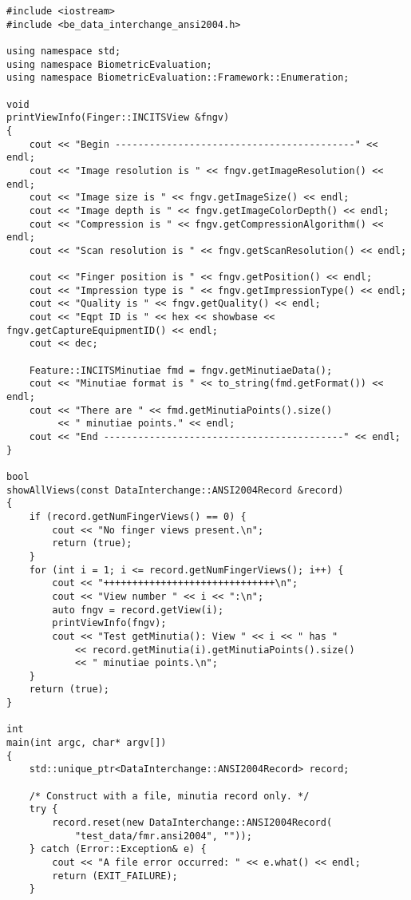 
\begin{lstlisting}[caption={ANSI 2004 Data Interchange}, label=lst:ansi2004diuse]
#include <iostream>
#include <be_data_interchange_ansi2004.h>

using namespace std;
using namespace BiometricEvaluation;
using namespace BiometricEvaluation::Framework::Enumeration;

void
printViewInfo(Finger::INCITSView &fngv)
{
	cout << "Begin ------------------------------------------" << endl;
	cout << "Image resolution is " << fngv.getImageResolution() << endl;
	cout << "Image size is " << fngv.getImageSize() << endl;
	cout << "Image depth is " << fngv.getImageColorDepth() << endl;
	cout << "Compression is " << fngv.getCompressionAlgorithm() << endl;
	cout << "Scan resolution is " << fngv.getScanResolution() << endl;

	cout << "Finger position is " << fngv.getPosition() << endl;
	cout << "Impression type is " << fngv.getImpressionType() << endl;
	cout << "Quality is " << fngv.getQuality() << endl;
	cout << "Eqpt ID is " << hex << showbase << fngv.getCaptureEquipmentID() << endl;
	cout << dec;

	Feature::INCITSMinutiae fmd = fngv.getMinutiaeData();
	cout << "Minutiae format is " << to_string(fmd.getFormat()) << endl;
	cout << "There are " << fmd.getMinutiaPoints().size()
	     << " minutiae points." << endl;
	cout << "End ------------------------------------------" << endl;
}

bool
showAllViews(const DataInterchange::ANSI2004Record &record)
{
	if (record.getNumFingerViews() == 0) {
		cout << "No finger views present.\n";
		return (true);
	}
	for (int i = 1; i <= record.getNumFingerViews(); i++) {
		cout << "++++++++++++++++++++++++++++++\n";
		cout << "View number " << i << ":\n";
		auto fngv = record.getView(i);
		printViewInfo(fngv);
		cout << "Test getMinutia(): View " << i << " has "
		    << record.getMinutia(i).getMinutiaPoints().size()
		    << " minutiae points.\n";
	}
	return (true);
}

int
main(int argc, char* argv[])
{
	std::unique_ptr<DataInterchange::ANSI2004Record> record;

	/* Construct with a file, minutia record only. */
	try {
		record.reset(new DataInterchange::ANSI2004Record(
		    "test_data/fmr.ansi2004", ""));
	} catch (Error::Exception& e) {
		cout << "A file error occurred: " << e.what() << endl;
		return (EXIT_FAILURE);
	}


\end{lstlisting}
